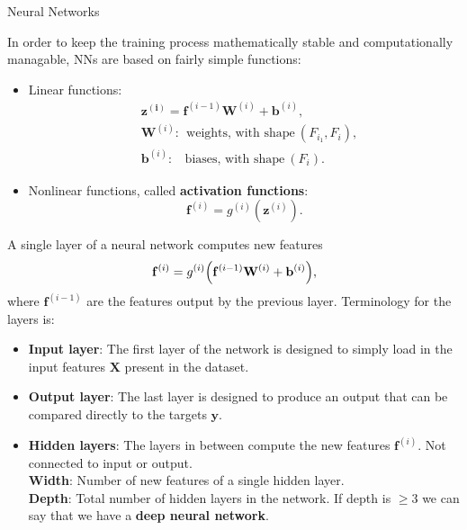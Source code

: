 \documentclass[12pt,t]{beamer}
\begin{document}
\begin{frame}{Neural Networks}


In order to keep the training process mathematically stable and computationally managable, NNs are based on fairly simple functions:
\begin{itemize}
\item Linear functions:
\begin{equation*} \begin{split}
&  \mathbf{z^{(i)}} = \mathbf{f}^{(i-1)} \mathbf{W}^{(i)} + \mathbf{b}^{(i)}, \\
&  \mathbf{W}^{(i)}: ~~\text{weights, with shape}~(F_{i_1}, F_i), \\
&   \mathbf{b}^{(i)}:~~~~\text{biases, with shape}~( F_i).
\end{split} \end{equation*}
\item Nonlinear functions, called {\bf activation functions}:
$$ \mathbf{f}^{(i)} = g^{(i)}(\mathbf{z}^{(i)}).$$
\end{itemize}
\end{frame}

\begin{frame}

A single layer of a neural network computes new features
$$ \mathbf{f}^{(i)} = g^{(i)} \Bigl(\mathbf{f}^{(i-1)} \mathbf{W}^{(i)} + \mathbf{b}^{(i)}\Bigr),$$
where $\mathbf{f}^{(i-1)}$ are the features output by the previous layer.   Terminology for the layers is:
\begin{itemize}
\item {\bf Input layer}: The first layer of the network is designed to simply load in the input features $\mathbf{X}$ present in the dataset.
\item {\bf Output layer}: The last layer is designed to produce an output that can be compared directly to the targets $\mathbf{y}$.
\item {\bf Hidden layers}: The layers in between compute the new features $\mathbf{f}^{(i)}$.  Not connected to input or output. \\
{\bf Width}: Number of new features of a single hidden layer. \\
{\bf Depth}: Total number of hidden layers in the network.  If depth is $\geq 3$ we can say that we have a {\bf deep neural network}.
\end{itemize}
\end{frame}
\end{document}

